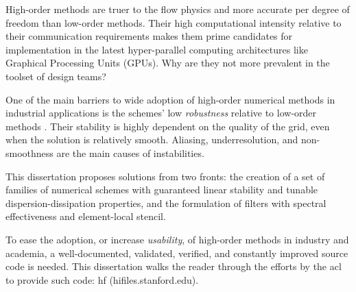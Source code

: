 
High-order methods are truer to the flow physics and more accurate per degree of freedom than low-order methods. Their high computational intensity relative to their communication requirements makes them prime candidates for implementation in the latest hyper-parallel computing architectures like Graphical Processing Units (GPUs). Why are they not more prevalent in the toolset of design teams? 

One of the main barriers to wide adoption of high-order numerical methods in industrial applications is the schemes' low \emph{robustness} relative to low-order methods \cite{vincent2011facilitating}. Their stability is highly dependent on the quality of the grid, even when the solution is relatively smooth. Aliasing, underresolution, and non-smoothness are the main causes of instabilities.

This dissertation proposes solutions from two fronts: the creation of a set of families of numerical schemes with guaranteed linear stability and tunable dispersion-dissipation properties, and the formulation of filters with spectral effectiveness and element-local stencil. 

To ease the adoption, or increase \emph{usability}, of high-order methods in industry and academia, a well-documented, validated, verified, and constantly improved source code is needed. This dissertation walks the reader through the efforts by the \gls{acl} to provide such code: \gls{hf} (hifiles.stanford.edu).
